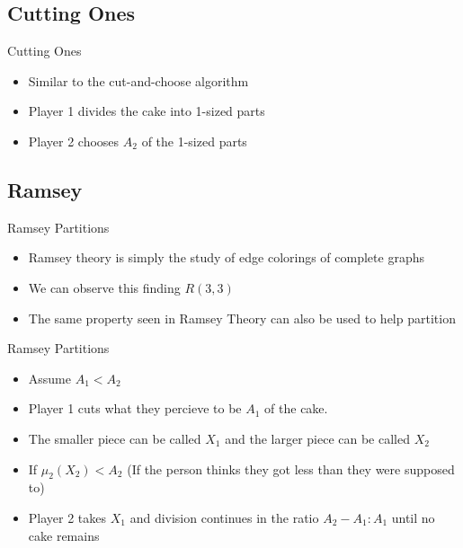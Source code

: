 \documentclass[aspectratio=169,xcolor=dvipsnames]{beamer}
\begin{document}
\subsection{Cutting Ones}
\begin{frame}{Cutting Ones}
	\begin{itemize}
		\item Similar to the cut-and-choose algorithm\pause
		\item Player 1 divides the cake into 1-sized parts
		\item Player 2 chooses $A_2$ of the 1-sized parts
	\end{itemize}
\end{frame}
\subsection{Ramsey}
\begin{frame}{Ramsey Partitions}
	\begin{itemize}
		\item Ramsey theory is simply the study of edge colorings of complete graphs\pause
		\item We can observe this finding $R(3, 3)$\pause
		\item The same property seen in Ramsey Theory can also be used to help partition
	\end{itemize}
\end{frame}
\begin{frame}{Ramsey Partitions}
	\begin{itemize}
		\item Assume $A_1 < A_2$
		\item Player 1 cuts what they percieve to be $A_1$ of the cake.
		\item The smaller piece can be called $X_1$ and the larger piece can be called $X_2$
		\item If $\mu_2(X_2) < A_2$ (If the person thinks they got less than they were supposed to)
		\item Player 2 takes $X_1$ and division continues in the ratio $A_2 - A_1: A_1$ until no cake remains
	\end{itemize}
\end{frame}
\end{document}
